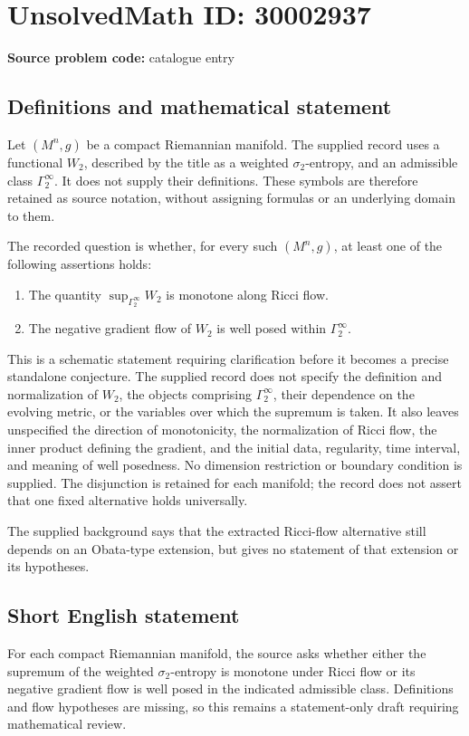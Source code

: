 \documentclass[11pt]{article}
\begin{document}
\section*{UnsolvedMath ID: 30002937}
\textbf{Source problem code:} catalogue entry
\subsection{Definitions and mathematical statement}
Let \((M^n,g)\) be a compact Riemannian manifold. The supplied record uses a functional \(W_2\), described by the title as a weighted \(\sigma_2\)-entropy, and an admissible class \(\Gamma_2^\infty\). It does not supply their definitions. These symbols are therefore retained as source notation, without assigning formulas or an underlying domain to them.

The recorded question is whether, for every such \((M^n,g)\), at least one of the following assertions holds:
\begin{enumerate}
\item The quantity \(\displaystyle \sup_{\Gamma_2^\infty} W_2\) is monotone along Ricci flow.
\item The negative gradient flow of \(W_2\) is well posed within \(\Gamma_2^\infty\).
\end{enumerate}

This is a schematic statement requiring clarification before it becomes a precise standalone conjecture. The supplied record does not specify the definition and normalization of \(W_2\), the objects comprising \(\Gamma_2^\infty\), their dependence on the evolving metric, or the variables over which the supremum is taken. It also leaves unspecified the direction of monotonicity, the normalization of Ricci flow, the inner product defining the gradient, and the initial data, regularity, time interval, and meaning of well posedness. No dimension restriction or boundary condition is supplied. The disjunction is retained for each manifold; the record does not assert that one fixed alternative holds universally.

The supplied background says that the extracted Ricci-flow alternative still depends on an Obata-type extension, but gives no statement of that extension or its hypotheses.
\subsection{Short English statement}
For each compact Riemannian manifold, the source asks whether either the supremum of the weighted \(\sigma_2\)-entropy is monotone under Ricci flow or its negative gradient flow is well posed in the indicated admissible class. Definitions and flow hypotheses are missing, so this remains a statement-only draft requiring mathematical review.
\end{document}
